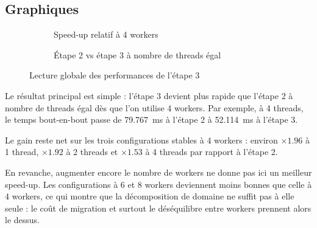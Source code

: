 \begin{table}[H]
    \centering
    \caption{Mesures détaillées des configurations stables de l'étape 3}
    \label{tab:stage3_details}
\end{table}

\subsection{Graphiques}

\begin{figure}[H]
    \centering
    \begin{subfigure}[t]{0.48\linewidth}
        \centering
        
        \caption{Speed-up relatif à 4 workers}
        \label{fig:stage3_speedup}
    \end{subfigure}
    \hfill
    \begin{subfigure}[t]{0.48\linewidth}
        \centering
        
        \caption{Étape 2 vs étape 3 à nombre de threads égal}
        \label{fig:stage2_vs_stage3}
    \end{subfigure}
    \caption{Lecture globale des performances de l'étape 3}
    \label{fig:stage3_global}
\end{figure}

Le résultat principal est simple : l'étape 3 devient plus rapide que l'étape 2 à nombre de threads égal dès que l'on utilise 4 workers. Par exemple, à 4 threads, le temps bout-en-bout passe de \SI{79.767}{ms} à l'étape 2 à \SI{52.114}{ms} à l'étape 3.

Le gain reste net sur les trois configurations stables à 4 workers : environ \(\times 1.96\) à 1 thread, \(\times 1.92\) à 2 threads et \(\times 1.53\) à 4 threads par rapport à l'étape 2.

En revanche, augmenter encore le nombre de workers ne donne pas ici un meilleur speed-up. Les configurations à 6 et 8 workers deviennent moins bonnes que celle à 4 workers, ce qui montre que la décomposition de domaine ne suffit pas à elle seule : le coût de migration et surtout le déséquilibre entre workers prennent alors le dessus.
